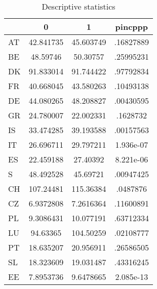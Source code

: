 \begin{table}[htbp]
\caption{\label{clabel} Descriptive statistics}\centering\medskip
\begin{tabular}{|l|c|c|c|}\hline  
 & 0  & 1  & pincppp  \\ \hline  
AT & 42.841735 & 45.603749 & .16827889 \\ \hline 
BE & 48.59746 & 50.30757 & .25995231 \\ \hline 
DK & 91.833014 & 91.744422 & .97792834 \\ \hline 
FR & 40.668045 & 43.580263 & .10493138 \\ \hline 
DE & 44.080265 & 48.208827 & .00430595 \\ \hline 
GR & 24.780007 & 22.002331 & .1628732 \\ \hline 
IS & 33.474285 & 39.193588 & .00157563 \\ \hline 
IT & 26.696711 & 29.797211 & 1.936e-07 \\ \hline 
ES & 22.459188 & 27.40392 & 8.221e-06 \\ \hline 
S & 48.492528 & 45.69721 & .00947425 \\ \hline 
CH & 107.24481 & 115.36384 & .0487876 \\ \hline 
CZ & 6.9372808 & 7.2616364 & .11600891 \\ \hline 
PL & 9.3086431 & 10.077191 & .63712334 \\ \hline 
LU & 94.63365 & 104.50259 & .02108777 \\ \hline 
PT & 18.635207 & 20.956911 & .26586505 \\ \hline 
SL & 18.323609 & 19.031487 & .43316245 \\ \hline 
EE & 7.8953736 & 9.6478665 & 2.085e-13 \\ \hline 
  \end{tabular}
\end{table}

